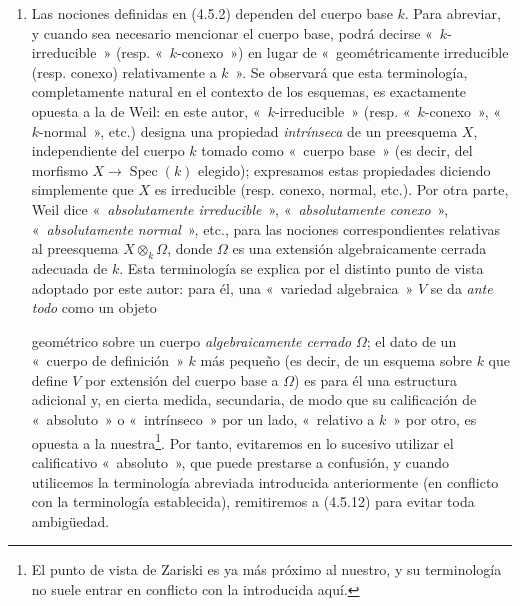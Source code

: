 \begin{remarks}[4.5.12]
\label{IV.2.4.5.12-fr}
\begin{enumerate}
\item[(i)] Las nociones definidas en (4.5.2) dependen del cuerpo base $k$.
Para abreviar, y cuando sea necesario mencionar el cuerpo base, podrá decirse
«~$k$-irreducible~» (resp. «~$k$-conexo~») en lugar de
«~geométricamente irreducible (resp. conexo) relativamente a $k$~». Se
observará que esta terminología, completamente natural en el contexto de los
esquemas, es exactamente opuesta a la de Weil: en este autor,
«~$k$-irreducible~» (resp. «~$k$-conexo~», «~$k$-normal~», etc.) designa una
propiedad \emph{intrínseca} de un preesquema $X$, independiente del cuerpo
$k$ tomado como «~cuerpo base~» (es decir, del morfismo
$X\to\operatorname{Spec}(k)$ elegido); expresamos estas propiedades diciendo
simplemente que $X$ es irreducible (resp. conexo, normal, etc.). Por otra
parte, Weil dice «~\emph{absolutamente irreducible}~», «~\emph{absolutamente conexo}~»,
«~\emph{absolutamente normal}~», etc., para las nociones correspondientes relativas
al preesquema $X\otimes_k\Omega$, donde $\Omega$ es una extensión
algebraicamente cerrada adecuada de $k$. Esta terminología se explica por el
distinto punto de vista adoptado por este autor: para él, una «~variedad
algebraica~» $V$ se da \emph{ante todo} como un objeto


geométrico sobre un cuerpo \emph{algebraicamente cerrado} $\Omega$; el dato de un
«~cuerpo de definición~» $k$ más pequeño (es decir, de un esquema sobre $k$
que define $V$ por extensión del cuerpo base a $\Omega$) es para él una
estructura adicional y, en cierta medida, secundaria, de modo que su
calificación de «~absoluto~» o «~intrínseco~» por un lado, «~relativo a
$k$~» por otro, es opuesta a la nuestra\footnote{El punto de vista de Zariski
es ya más próximo al nuestro, y su terminología no suele entrar en conflicto
con la introducida aquí.}. Por tanto, evitaremos en lo sucesivo utilizar el
calificativo «~absoluto~», que puede prestarse a confusión, y cuando
utilicemos la terminología abreviada introducida anteriormente (en conflicto
con la terminología establecida), remitiremos a (4.5.12) para evitar toda
ambigüedad.


\end{enumerate}
\end{remarks}
